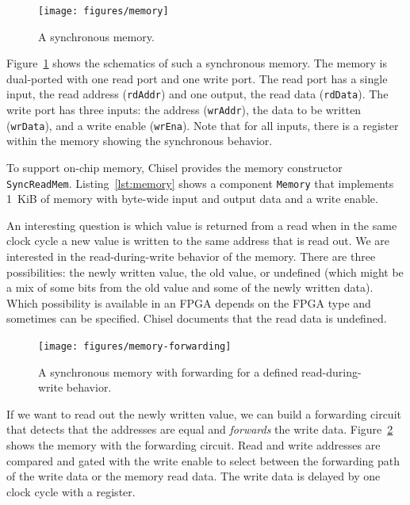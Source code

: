 \documentclass[%
    10pt,
    headinclude, footexclude,
    openright, %
    notitlepage,
    cleardoubleempty,
    headsepline,
    pointlessnumbers,
    bibtotoc, idxtotoc,
    ]{scrbook}
\newcommand{\code}[1]{{\small{\texttt{#1}}}}
\begin{document}
\begin{figure}
  \centering
  \texttt{[image: figures/memory]}
  \caption{A synchronous memory.}
  \label{fig:memory}
\end{figure}

Figure~\ref{fig:memory} shows the schematics of such a synchronous memory.
The memory is dual-ported with one read port and one write port.
The read port has a single input, the read address (\code{rdAddr}) and
one output, the read data (\code{rdData}).
The write port has three inputs: the address (\code{wrAddr}), the data
to be written (\code{wrData}), and a write enable (\code{wrEna}).
Note that for all inputs, there is a register within the memory showing the
synchronous behavior.

To support on-chip memory, Chisel provides the memory constructor \code{SyncReadMem}.
Listing~\ref{lst:memory} shows a component \code{Memory} that implements
1~KiB of memory with byte-wide input and output data and a write enable.


An interesting question is which value is returned from a read when in the same clock
cycle a new value is written to the same address that is read out.
We are interested in the read-during-write behavior of the memory.
There are three possibilities: the newly written value, the old value, or undefined
(which might be a mix of some bits from the old value and some of the newly written data).
Which possibility is available in an FPGA depends on the FPGA type and
sometimes can be specified.
Chisel documents that the read data is undefined.

\begin{figure}
  \centering
  \texttt{[image: figures/memory-forwarding]}
  \caption{A synchronous memory with forwarding for a defined read-during-write behavior.}
  \label{fig:memory:forwarding}
\end{figure}

If we want to read out the newly written value, we can build a forwarding
circuit that detects that the addresses are equal and \emph{forwards} the
write data. Figure~\ref{fig:memory:forwarding} shows the memory with
the forwarding circuit. Read and write addresses are compared and gated with
the write enable to select between the forwarding path of the write data or the
memory read data. The write data is delayed by one clock cycle with a register.
\end{document}
